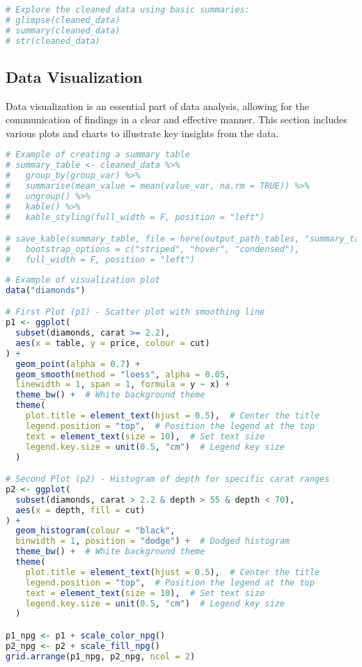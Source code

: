 \documentclass[
  12pt,
]{article}
\begin{document}
\begin{lstlisting}[language=R]
# Explore the cleaned data using basic summaries:
# glimpse(cleaned_data)
# summary(cleaned_data)
# str(cleaned_data)
\end{lstlisting}

\subsection{Data Visualization}\label{data-visualization}

Data visualization is an essential part of data analysis, allowing for
the communication of findings in a clear and effective manner. This
section includes various plots and charts to illustrate key insights
from the data.

\begin{lstlisting}[language=R]
# Example of creating a summary table 
# summary_table <- cleaned_data %>%
#   group_by(group_var) %>%
#   summarise(mean_value = mean(value_var, na.rm = TRUE)) %>%
#   ungroup() %>%
#   kable() %>%
#   kable_styling(full_width = F, position = "left") 

# save_kable(summary_table, file = here(output_path_tables, "summary_table.html"),
#   bootstrap_options = c("striped", "hover", "condensed"),
#   full_width = F, position = "left")
\end{lstlisting}

\begin{lstlisting}[language=R]
# Example of visualization plot
data("diamonds")

# First Plot (p1) - Scatter plot with smoothing line
p1 <- ggplot(
  subset(diamonds, carat >= 2.2),
  aes(x = table, y = price, colour = cut)
) +
  geom_point(alpha = 0.7) +  
  geom_smooth(method = "loess", alpha = 0.05,
  linewidth = 1, span = 1, formula = y ~ x) +  
  theme_bw() +  # White background theme
  theme(
    plot.title = element_text(hjust = 0.5),  # Center the title
    legend.position = "top",  # Position the legend at the top
    text = element_text(size = 10),  # Set text size
    legend.key.size = unit(0.5, "cm")  # Legend key size
  )

# Second Plot (p2) - Histogram of depth for specific carat ranges
p2 <- ggplot(
  subset(diamonds, carat > 2.2 & depth > 55 & depth < 70),
  aes(x = depth, fill = cut)
) +
  geom_histogram(colour = "black",
  binwidth = 1, position = "dodge") +  # Dodged histogram
  theme_bw() +  # White background theme
  theme(
    plot.title = element_text(hjust = 0.5),  # Center the title
    legend.position = "top",  # Position the legend at the top
    text = element_text(size = 10),  # Set text size
    legend.key.size = unit(0.5, "cm")  # Legend key size
  )

p1_npg <- p1 + scale_color_npg()
p2_npg <- p2 + scale_fill_npg()
grid.arrange(p1_npg, p2_npg, ncol = 2)
\end{lstlisting}
\end{document}
